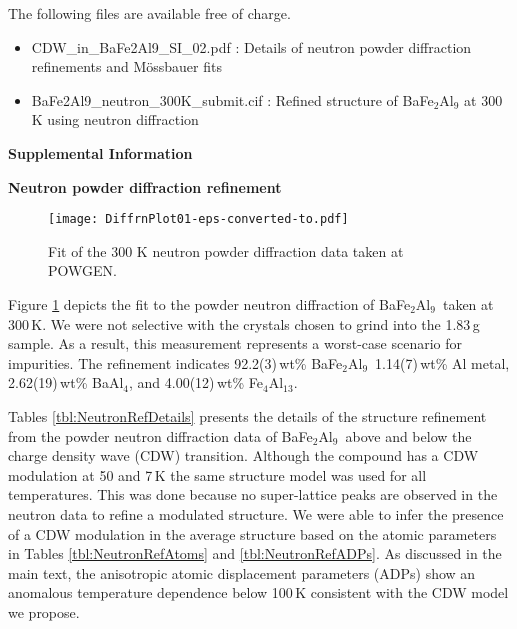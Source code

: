 \documentclass[journal=cmatex,manuscript=article]{achemso}
\newcommand{\BaFeAl}{BaFe$_2$Al$_9$}
\begin{document}
\begin{suppinfo}
\label{sec:suppinfo}


	

The following files are available free of charge.
\begin{itemize}
	\item CDW\_in\_BaFe2Al9\_SI\_02.pdf : Details of neutron powder diffraction refinements and M\"ossbauer fits
	\item BaFe2Al9\_neutron\_300K\_submit.cif : Refined structure of BaFe$_2$Al$_9$ at 300\,K using neutron diffraction
\end{itemize}

\textbf{Supplemental Information}

\textbf{Neutron powder diffraction refinement}
\label{sec:suppinfo_NeutronRefine}

\begin{figure}
	\texttt{[image: DiffrnPlot01-eps-converted-to.pdf]}
	\caption{\label{fig:SI_NeutronFit} 
		Fit of the 300 K neutron powder diffraction data taken at POWGEN.
	}
\end{figure}

Figure \ref{fig:SI_NeutronFit} depicts the fit to the powder neutron diffraction of \BaFeAl\ taken at 300\,K. We were not selective with the crystals chosen to grind into the 1.83\,g sample. As a result, this measurement represents a worst-case scenario for impurities. The refinement indicates 92.2(3)\,wt\% \BaFeAl\, 1.14(7)\,wt\% Al metal, 2.62(19)\,wt\% BaAl$_4$, and 4.00(12)\,wt\% Fe$_4$Al$_{13}$.


Tables \ref{tbl:NeutronRefDetails} presents the details of the structure refinement from the powder neutron diffraction data of \BaFeAl\ above and below the charge density wave (CDW) transition. Although the compound has a CDW modulation at 50 and 7\,K the same structure model was used for all temperatures. This was done because no super-lattice peaks are observed in the neutron data to refine a modulated structure. We were able to infer the presence of a CDW modulation in the average structure based on the atomic parameters in Tables \ref{tbl:NeutronRefAtoms} and \ref{tbl:NeutronRefADPs}. As discussed in the main text, the anisotropic atomic displacement parameters (ADPs) show an anomalous temperature dependence below 100\,K consistent with the CDW model we propose.


\end{suppinfo}
\end{document}

